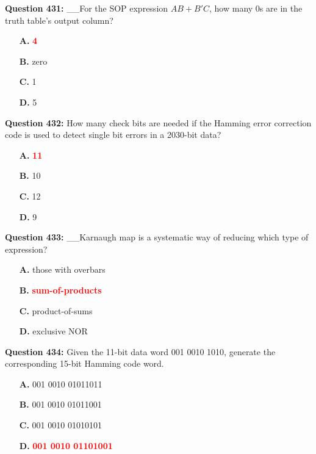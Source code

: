 \documentclass[12pt,a4paper]{article}
\begin{document}
\vspace{0.5cm}

\textbf{Question 431:} __For the SOP expression $AB + B'C$, how many 0s are in the truth table's output column?

\begin{itemize}
    \item[\textbf{A.}] \textcolor{red}{\textbf{4}}
    \item[\textbf{B.}] zero
    \item[\textbf{C.}] 1
    \item[\textbf{D.}] 5
\end{itemize}

\vspace{0.5cm}

\textbf{Question 432:} How many check bits are needed if the Hamming error correction code is used to detect single bit errors in a 2030-bit data?

\begin{itemize}
    \item[\textbf{A.}] \textcolor{red}{\textbf{11}}
    \item[\textbf{B.}] 10
    \item[\textbf{C.}] 12
    \item[\textbf{D.}] 9
\end{itemize}

\vspace{0.5cm}

\textbf{Question 433:} __Karnaugh map is a systematic way of reducing which type of expression?

\begin{itemize}
    \item[\textbf{A.}] those with overbars
    \item[\textbf{B.}] \textcolor{red}{\textbf{sum-of-products}}
    \item[\textbf{C.}] product-of-sums
    \item[\textbf{D.}] exclusive NOR
\end{itemize}

\vspace{0.5cm}

\textbf{Question 434:} Given the 11-bit data word 001 0010 1010, generate the corresponding 15-bit Hamming code word.

\begin{itemize}
    \item[\textbf{A.}] 001 0010 01011011
    \item[\textbf{B.}] 001 0010 01011001
    \item[\textbf{C.}] 001 0010 01010101
    \item[\textbf{D.}] \textcolor{red}{\textbf{001 0010 01101001}}
\end{itemize}
\end{document}
